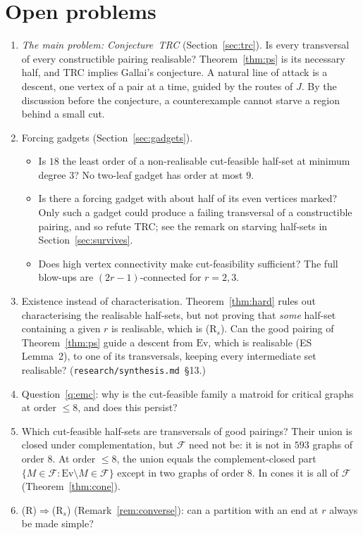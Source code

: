 \documentclass[11pt]{amsart}
\theoremstyle{definition}
\newcommand{\Ev}{\mathrm{Ev}}
\newcommand{\cF}{\mathcal F}
\begin{document}
\section{Open problems}
\begin{enumerate}
\item \emph{The main problem: Conjecture~TRC} (Section~\ref{sec:trc}). Is every transversal of every
constructible pairing realisable? Theorem~\ref{thm:ps} is its necessary half, and TRC implies Gallai's
conjecture. A natural line of attack is a descent, one vertex of a pair at a time, guided by the
routes of $J$. By the discussion before the conjecture, a counterexample cannot starve a region
behind a small cut.
\item Forcing gadgets (Section~\ref{sec:gadgets}).
\begin{itemize}
\item Is $18$ the least order of a non-realisable cut-feasible half-set at minimum degree $3$? No
two-leaf gadget has order at most $9$.
\item Is there a forcing gadget with about half of its even vertices marked? Only such a gadget could
produce a failing transversal of a constructible pairing, and so refute TRC; see the remark on
starving half-sets in Section~\ref{sec:survives}.
\item Does high vertex connectivity make cut-feasibility sufficient? The full blow-ups are
$(2r-1)$-connected for $r=2,3$.
\end{itemize}
\item Existence instead of characterisation. Theorem~\ref{thm:hard} rules out characterising the
realisable half-sets, but not proving that \emph{some} half-set containing a given $r$ is realisable,
which is (R$_s$). Can the good pairing of Theorem~\ref{thm:ps} guide a descent from $\Ev$, which is
realisable (ES Lemma~2), to one of its transversals, keeping every intermediate set realisable?
(\texttt{research/synthesis.md}~\S13.)
\item Question~\ref{q:emc}: why is the cut-feasible family a matroid for critical graphs at order
$\le 8$, and does this persist?
\item Which cut-feasible half-sets are transversals of good pairings? Their union is closed under
complementation, but $\cF$ need not be: it is not in $593$ graphs of order $8$. At order $\le 8$, the
union equals the complement-closed part $\{M\in\cF:\Ev\setminus M\in\cF\}$ except in two graphs of
order $8$. In cones it is all of $\cF$ (Theorem~\ref{thm:cone}).
\item (R)$\Rightarrow$(R$_s$) (Remark~\ref{rem:converse}): can a partition with an end at $r$ always be
made simple?
\end{enumerate}
\end{document}
